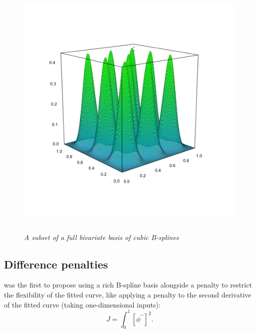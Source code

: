 \begin{figure}[H]
  \centering
  \graphicspath{{img/}}
  \includegraphics[width=5in,height=5in]{sparse_bicubic_basis.png}
  \caption{\textit{A subset of a full bivariate basis of cubic B-splines}}\label{fig:sparse_bicubic_BS_basis}
\end{figure}



\subsection{Difference penalties}

\cite{o1986statistical} was the first to propose using a rich B-spline basis alongside a penalty to restrict the flexibility of the fitted curve, like \citet{wahba1990spline} applying a penalty to the second derivative of the fitted curve (taking one-dimensional inputs):
\begin{equation} \label{eq:second-derivative-penalty}
J = \int_0^1 \left[ \phi^{\prime \prime}\right]^2.
\end{equation}

